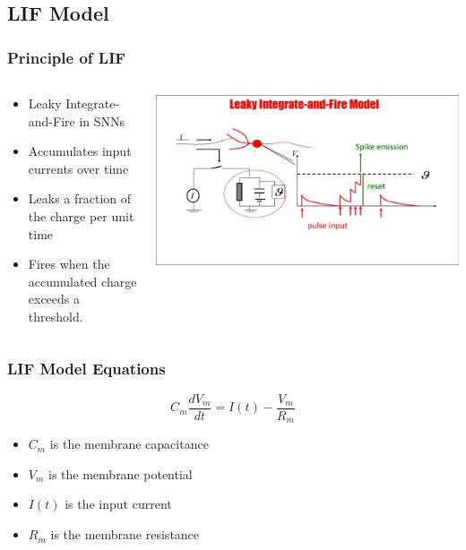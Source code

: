 \documentclass[aspectratio=169, 11pt]{beamer}
\begin{document}
\subsection{LIF Model}
\begin{frame}
  \frametitle{Principle of LIF}
  \begin{columns}
    \begin{column}{0.5\textwidth}
      \begin{itemize}
        \item Leaky Integrate-and-Fire in SNNs
        \item Accumulates input currents over time
        \item Leaks a fraction of the charge per unit time
        \item Fires when the accumulated charge exceeds a threshold.
      \end{itemize}
    \end{column}
    \begin{column}{0.5\textwidth}
      \includegraphics[width=\textwidth]{image/lif.png}
    \end{column}
  \end{columns}
\end{frame}

\begin{frame}
  \frametitle{LIF Model Equations}
  $$C_m \frac{d V_m}{d t} = I(t) - \frac{V_m}{R_m} $$
  \begin{itemize}
    \item $C_m$ is the membrane capacitance
    \item $V_m$ is the membrane potential
    \item $I(t)$ is the input current
    \item $R_m$ is the membrane resistance
  \end{itemize}
\end{frame}
\end{document}
